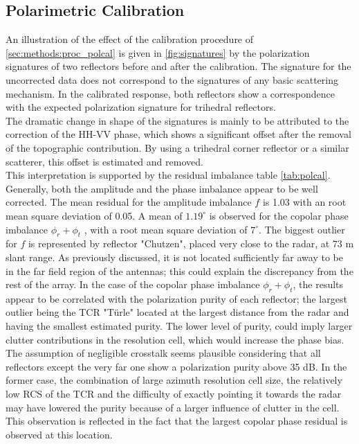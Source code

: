 \subsection{Polarimetric Calibration}
An illustration of the effect of the calibration procedure of \autoref{sec:methods:proc_polcal} is given in  \autoref{fig:signatures} by the polarization signatures of two reflectors before and after the calibration.
The signature for the uncorrected data does not correspond to the signatures of any basic scattering mechanism. In the calibrated response, both reflectors show a correspondence with the expected polarization signature for trihedral reflectors.\\ The dramatic change in shape of the signatures is mainly to be attributed to the correction of the HH-VV phase, which shows a significant offset after the removal of the topographic contribution. By using a trihedral corner reflector or a similar scatterer, this offset is estimated and removed.\\
This interpretation is supported by the residual imbalance table \autoref{tab:polcal}.
Generally, both the amplitude and the phase imbalance appear to be well corrected. The mean residual for the amplitude imbalance $f$ is 1.03 with an root mean square deviation of 0.05. A mean of $1.19^\circ$ is observed for the copolar phase imbalance $\phi_r + \phi_t$ , with a root mean square deviation of $7^\circ$. The biggest outlier for $f$ is represented by reflector "Chutzen", placed very close to the radar, at 73 m slant range. As previously discussed, it is not located sufficiently far away to be in the far field region of the antennas; this could explain the discrepancy from the rest of the array. In the case of the copolar phase imbalance $\phi_r + \phi_t$, the results appear to be correlated with the polarization purity of each reflector; the largest outlier being the TCR "T\"{u}rle" located at the largest distance from the radar and having the smallest estimated purity. The lower level of purity, could imply larger clutter contributions in the resolution cell, which would increase the phase bias.\\
The assumption of negligible crosstalk seems plausible considering that all reflectors  except the very far one show a polarization purity above 35 dB. In the former case, the combination of large azimuth resolution cell size, the relatively low RCS of the TCR and  the difficulty of exactly pointing it towards the radar may have lowered the purity because of a larger influence of clutter in the cell. This observation is reflected in the fact that the largest copolar phase residual is observed at this location.\\
